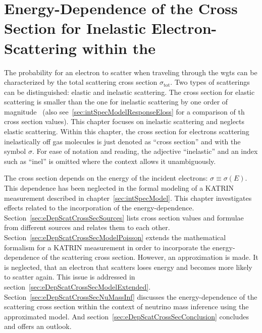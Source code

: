 \def\currentRootFolder{chapter/energyDependentCrossSec}
\def\currentFigureFolder{\currentRootFolder/fig}


\chapter{Energy-Dependence of the Cross Section for Inelastic Electron-Scattering within the }
\label{sec:eDepScatCrossSec}
The probability for an electron to scatter when traveling through the \gls{wgts} can be characterized by the total scattering cross section $\sigma_\mathrm{tot}$. Two types of scatterings can be distinguished: elastic and inelastic scattering. The cross section for elastic scattering is smaller than the one for inelastic scattering by one order of magnitude~\cite{Kleesiek2019} (also see~\ref{sec:intSpecModelResponseEloss} for a comparison of th cross section values). This chapter focuses on inelastic scattering and neglects elastic scattering. Within this chapter, the cross section for electrons scattering inelastically off gas molecules is just denoted as ``cross section'' and with the symbol $\sigma$. For ease of notation and reading, the adjective ``inelastic'' and an index such as ``inel'' is omitted where the context allows it unambiguously.

The cross section depends on the energy of the incident electrons: $\sigma \equiv \sigma(E)$. This dependence has been neglected in the formal modeling of a KATRIN measurement described in chapter~\ref{sec:intSpecModel}. This chapter investigates effects related to the incorporation of the energy-dependence. Section~\ref{sec:eDepScatCrossSecSources} lists cross section values and formulae from different sources and relates them to each other. Section~\ref{sec:eDepScatCrossSecModelPoisson} extends the mathematical formalism for a KATRIN measurement in order to incorporate the energy-dependence of the scattering cross section. However, an approximation is made. It is neglected, that an electron that scatters loses energy and becomes more likely to scatter again. This issue is addressed in section~\ref{sec:eDepScatCrossSecModelExtended}. Section~\ref{sec:eDepScatCrossSecNuMassInf} discusses the energy-dependence of the scattering cross section within the context of neutrino mass inference using the approximated model. And section~\ref{sec:eDepScatCrossSecConclusion} concludes and offers an outlook.


